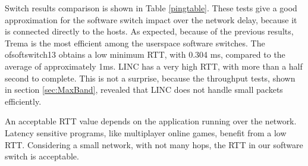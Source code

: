     Switch results comparison is shown in Table \ref{pingtable}. These tests give a good approximation for the software switch impact over the network delay, because it is connected directly to the hosts. As expected, because of the previous results, Trema is the most efficient among the userspace software switches. The ofsoftswitch13 obtains a low minimum RTT, with 0.304 ms, compared to the average of approximately 1ms. LINC has a very high RTT, with more than a half second to complete. This is not a surprise, because the throughput tests, shown in section \ref{sec:MaxBand}, revealed that LINC does not handle small packets efficiently.
    
    An acceptable RTT value depends on the application running over the network. Latency sensitive programs, like multiplayer online games, benefit from a low RTT. Considering a small network, with not many hops, the RTT in our software switch is acceptable.   

    \begin{table}[H]
    \caption{Ping Round Trip Time comparison between software switches}
    \label{pingtable}
    \end{table}




